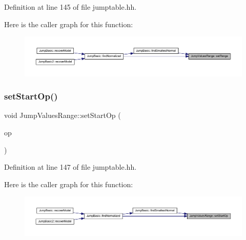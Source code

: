 Definition at line 145 of file jumptable.\+hh.

Here is the caller graph for this function\+:
\nopagebreak
\begin{figure}[H]
\begin{center}
\leavevmode
\includegraphics[width=350pt]{class_jump_values_range_a0554839f996b5963e7463ba465fb1976_icgraph}
\end{center}
\end{figure}
\mbox{\label{class_jump_values_range_a859dc82b82e26dd7ef90299ca369ce49}} 
\subsubsection{\texorpdfstring{setStartOp()}{setStartOp()}}
{\footnotesize\ttfamily void Jump\+Values\+Range\+::set\+Start\+Op (\begin{DoxyParamCaption}\item[{\mbox{\hyperlink{class_pcode_op}{Pcode\+Op}} $\ast$}]{op }\end{DoxyParamCaption})\hspace{0.3cm}{\ttfamily [inline]}}



Definition at line 147 of file jumptable.\+hh.

Here is the caller graph for this function\+:
\nopagebreak
\begin{figure}[H]
\begin{center}
\leavevmode
\includegraphics[width=350pt]{class_jump_values_range_a859dc82b82e26dd7ef90299ca369ce49_icgraph}
\end{center}
\end{figure}
\mbox{\label{class_jump_values_range_a56c468c294cc0da0dadb756ef16d72ab}} 
